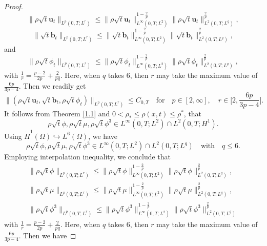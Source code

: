 \documentclass[11pt]{article}
\numberwithin{equation}{section}
\begin{document}
\begin{proof}
\begin{equation*}
\|\rho\sqrt{t}\mathbf{u}_t\|_{L^p(0,T;L^r)} \leq \|\rho\sqrt{t}\mathbf{u}_t\|_{L^\infty(0,T;L^2)}^{1 - \frac{2}{p}} \|\rho\sqrt{t}\mathbf{u}_t\|_{L^2(0,T;L^q)}^{\frac{2}{p}},
\end{equation*}
\begin{equation*}
\|\sqrt{t}\mathbf{b}_t\|_{L^p(0,T;L^r)} \leq \|\sqrt{t}\mathbf{b}_t\|_{L^\infty(0,T;L^2)}^{1 - \frac{2}{p}} \|\sqrt{t}\mathbf{b}_t\|_{L^2(0,T;L^q)}^{\frac{2}{p}},
\end{equation*}
and
\begin{equation*}
\|\rho\sqrt{t}\phi_t\|_{L^p(0,T;L^r)} \leq \|\rho\sqrt{t}\phi_t\|_{L^\infty(0,T;L^2)}^{1 - \frac{2}{p}} \|\rho\sqrt{t}\phi_t\|_{L^2(0,T;L^q)}^{\frac{2}{p}},
\end{equation*}
with \(\frac{1}{r} = \frac{p - 2}{2p} + \frac{2}{pq}\). Here, when \(q\) takes \(6\), then \(r\) may take the maximum value of \(\frac{6p}{3p - 4}\). Then we readily get
\begin{equation}
\|(\rho\sqrt{t}\mathbf{u}_t, \sqrt{t}\mathbf{b}_t, \rho\sqrt{t}\phi_t)\|_{L^p(0,T;L^r)} \leq C_{0,T} \quad \text{for} \quad p \in [2,\infty], \quad r \in \Big[2, \frac{6p}{3p - 4}\Big].\label{eq-11}
\end{equation}
It follows from Theorem \ref{1.1} and $0<\rho_* \leq \rho(x, t) \leq \rho^*$, that
\begin{equation*}
\rho\sqrt{t}\phi, \rho\sqrt{t}\mu, \rho\sqrt{t}\phi^3 \in L^\infty(0,T;L^2) \cap L^2(0,T;H^1).
\end{equation*}
Using $\dot{H}^1(\Omega) \hookrightarrow L^6(\Omega)$, we have
\begin{equation*}
\rho\sqrt{t}\phi, \rho\sqrt{t}\mu, \rho\sqrt{t}\phi^3 \in L^\infty(0,T;L^2) \cap L^2(0,T;L^q) \quad \text{with} \quad q \leq 6.
\end{equation*}
Employing  interpolation inequality, we conclude that
\begin{align*}
\|\rho\sqrt{t}\phi\|_{L^p(0,T;L^r)} \leq \|\rho\sqrt{t}\phi\|_{L^\infty(0,T;L^2)}^{1 - \frac{2}{p}} \|\rho\sqrt{t}\phi\|_{L^2(0,T;L^q)}^{\frac{2}{p}},\\
\|\rho\sqrt{t}\mu\|_{L^p(0,T;L^r)} \leq \|\rho\sqrt{t}\mu\|_{L^\infty(0,T;L^2)}^{1 - \frac{2}{p}} \|\rho\sqrt{t}\mu\|_{L^2(0,T;L^q)}^{\frac{2}{p}},\\
\|\rho\sqrt{t}\phi^3\|_{L^p(0,T;L^r)} \leq \|\rho\sqrt{t}\phi^3\|_{L^\infty(0,T;L^2)}^{1 - \frac{2}{p}} \|\rho\sqrt{t}\phi^3\|_{L^2(0,T;L^q)}^{\frac{2}{p}}
\end{align*}
with \(\frac{1}{r} = \frac{p - 2}{2p} + \frac{2}{pq}\). Here, when \(q\) takes \(6\), then \(r\) may take the maximum value of \(\frac{6p}{3p - 4}\). Then we have

\end{proof}
\end{document}
